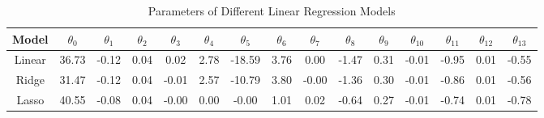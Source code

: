 \begin{table}[H]
\centering
\caption{Parameters of Different Linear Regression Models}
\label{tab:modelsParams}
\begin{tabular}{ccccccccccccccc}
\toprule
Model & $\theta_0$ & $\theta_{1}$ & $\theta_{2}$ & $\theta_{3}$ & $\theta_{4}$ & $\theta_{5}$ & $\theta_{6}$ & $\theta_{7}$ & $\theta_{8}$ & $\theta_{9}$ & $\theta_{10}$ & $\theta_{11}$ & $\theta_{12}$ & $\theta_{13}$ \\
\midrule
Linear & 36.73 & -0.12 & 0.04 & 0.02 & 2.78 & -18.59 & 3.76 & 0.00 & -1.47 & 0.31 & -0.01 & -0.95 & 0.01 & -0.55 \\
Ridge & 31.47 & -0.12 & 0.04 & -0.01 & 2.57 & -10.79 & 3.80 & -0.00 & -1.36 & 0.30 & -0.01 & -0.86 & 0.01 & -0.56 \\
Lasso & 40.55 & -0.08 & 0.04 & -0.00 & 0.00 & -0.00 & 1.01 & 0.02 & -0.64 & 0.27 & -0.01 & -0.74 & 0.01 & -0.78 \\
\bottomrule
\end{tabular}
\end{table}
